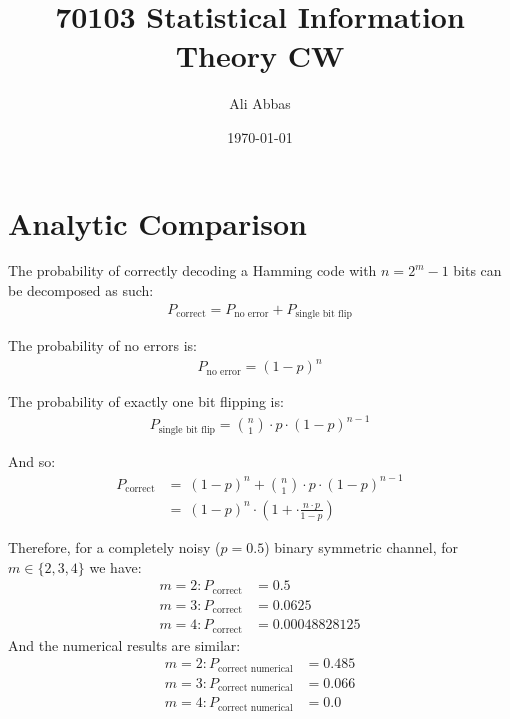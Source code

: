 \documentclass[fleqn]{article}
\date{\today}
\author{Ali Abbas}
\title{70103 Statistical Information Theory CW}
\begin{document}
  \maketitle
  \section{Analytic Comparison}
  The probability of correctly decoding a Hamming code with $n = 2^m - 1$ bits can be decomposed as such:
  \begin{align*}
    P_{\text{correct}} = P_{\text{no error}} + P_{\text{single bit flip}}
  \end{align*}
  
  The probability of no errors is:
  \begin{align*}
    P_{\text{no error}} = (1 - p)^n
  \end{align*}
  
  The probability of exactly one bit flipping is:
  \begin{align*}
    P_{\text{single bit flip}} = \binom{n}{1} \cdot p \cdot (1 - p)^{n-1}
  \end{align*}
  
  And so:
  \begin{align*}
    P_{\text{correct}} &=\ (1 - p)^n + \binom{n}{1} \cdot p \cdot (1 - p)^{n-1} \\
     &=\ (1 - p)^n \cdot \left(1 + \cdot \frac{n \cdot p}{1 - p}\right)
  \end{align*}

  Therefore, for a completely noisy ($p = 0.5$) binary symmetric channel, for $m \in \{2, 3, 4 \}$ we have:
  \begin{align*}
    m = 2: P_{\text{correct}} &= 0.5 \\
    m = 3: P_{\text{correct}} &= 0.0625 \\
    m = 4: P_{\text{correct}} &= 0.00048828125
  \end{align*}
  And the numerical results are similar:
  \begin{align*}
    m = 2: P_{\text{correct numerical}} &= 0.485 \\
    m = 3: P_{\text{correct numerical}} &= 0.066 \\
    m = 4: P_{\text{correct numerical}} &= 0.0
  \end{align*}

  \pagebreak
\end{document}
